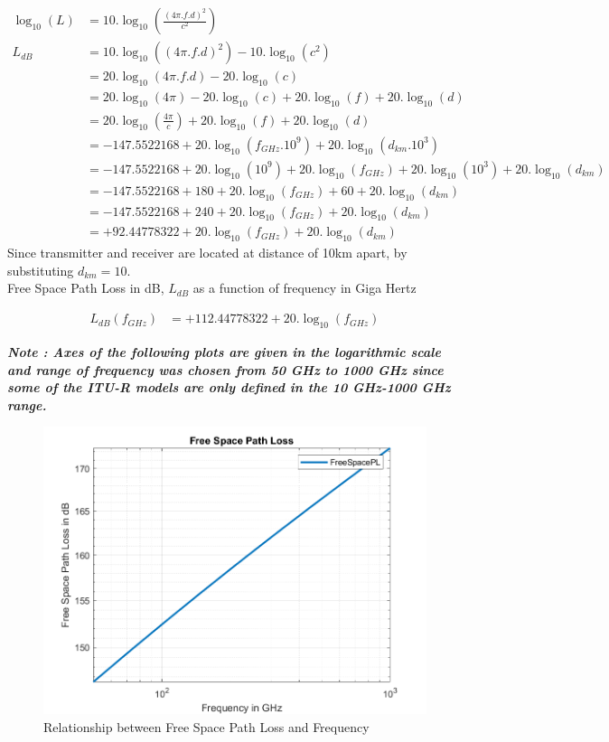 \documentclass[a4paper,11pt]{article}%
\begin{document}
\[
\begin{split}
\log_{10}(L) &= 10.\log_{10}(\frac{(4\pi.f.d)^2}{c^2})\\
L_{dB}& = 10.\log_{10}((4\pi.f.d)^2) - 10.\log_{10}(c^2)\\
&=20.\log_{10}(4\pi.f.d)-20.\log_{10}(c)\\
&=20.\log_{10}(4\pi)-20.\log_{10}(c) + 20.\log_{10}(f) + 20.\log_{10}(d)\\
&=20.\log_{10}(\frac{4\pi}{c}) + 20.\log_{10}(f) + 20.\log_{10}(d)\\
&= -147.5522168 + 20.\log_{10}(f_{GHz}.10^9) + 20.\log_{10}(d_{km}.10^3)\\
& = -147.5522168 + 20.\log_{10}(10^9)+ 20.\log_{10}(f_{GHz}) + 20.\log_{10}(10^3) + 20.\log_{10}(d_{km})\\
&= -147.5522168 + 180+ 20.\log_{10}(f_{GHz}) + 60 + 20.\log_{10}(d_{km})\\
&= -147.5522168 + 240+ 20.\log_{10}(f_{GHz}) + 20.\log_{10}(d_{km})\\
&= +92.44778322+20.\log_{10}(f_{GHz}) + 20.\log_{10}(d_{km})
\end{split}
\]
Since transmitter and receiver are located at distance of 10km apart, by substituting $d_{km}= 10$.\\

Free Space Path Loss in dB, $L_{dB}$ as a function of frequency in Giga Hertz

\[
\begin{split}
L_{dB}(f_{GHz})&=  +112.44778322+20.\log_{10}(f_{GHz})
\end{split}
\]

\textbf{\textit{Note : Axes of the following plots are given in the logarithmic scale and range of frequency was chosen from 50 GHz to 1000 GHz since some of the ITU-R models are only defined in the 10 GHz-1000 GHz range.}}

\begin{figure}[!h]
	\centering
	\includegraphics[scale=0.75]{code/FreeSpacePL.png}
	\caption{Relationship between Free Space Path Loss and Frequency}
\end{figure}
\end{document}
